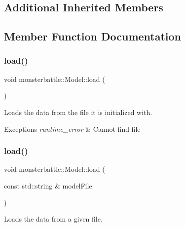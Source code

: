 \subsection*{Additional Inherited Members}


\subsection{Member Function Documentation}
\mbox{\label{classmonsterbattle_1_1Model_a3c62f10cd50abeaa2ec6a76b7810c94a}} 
\subsubsection{\texorpdfstring{load()}{load()}\hspace{0.1cm}{\footnotesize\ttfamily [1/2]}}
{\footnotesize\ttfamily void monsterbattle\+::\+Model\+::load (\begin{DoxyParamCaption}{ }\end{DoxyParamCaption})}



Loads the data from the file it is initialized with. 


\begin{DoxyExceptions}{Exceptions}
{\em runtime\+\_\+error} & Cannot find file \\
\hline
\end{DoxyExceptions}
\mbox{\label{classmonsterbattle_1_1Model_a379ea5c7c9d5d1ae0a1a8cec76b1c0d9}} 
\subsubsection{\texorpdfstring{load()}{load()}\hspace{0.1cm}{\footnotesize\ttfamily [2/2]}}
{\footnotesize\ttfamily void monsterbattle\+::\+Model\+::load (\begin{DoxyParamCaption}\item[{const std\+::string \&}]{model\+File }\end{DoxyParamCaption})}



Loads the data from a given file. 


